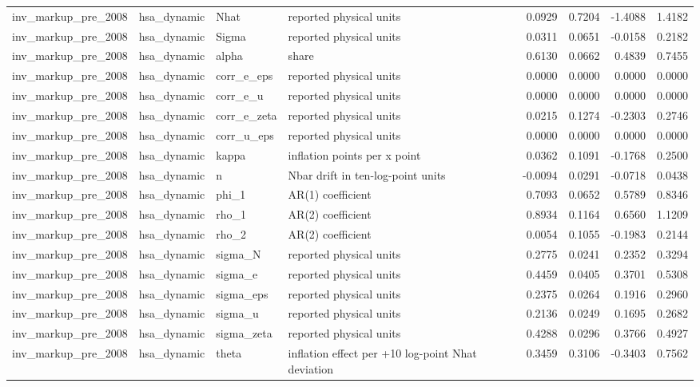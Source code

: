 \begin{tabular}{llllrrrr}
inv\_markup\_pre\_2008 & hsa\_dynamic & Nhat & reported physical units & 0.0929 & 0.7204 & -1.4088 & 1.4182 \\
inv\_markup\_pre\_2008 & hsa\_dynamic & Sigma & reported physical units & 0.0311 & 0.0651 & -0.0158 & 0.2182 \\
inv\_markup\_pre\_2008 & hsa\_dynamic & alpha & share & 0.6130 & 0.0662 & 0.4839 & 0.7455 \\
inv\_markup\_pre\_2008 & hsa\_dynamic & corr\_e\_eps & reported physical units & 0.0000 & 0.0000 & 0.0000 & 0.0000 \\
inv\_markup\_pre\_2008 & hsa\_dynamic & corr\_e\_u & reported physical units & 0.0000 & 0.0000 & 0.0000 & 0.0000 \\
inv\_markup\_pre\_2008 & hsa\_dynamic & corr\_e\_zeta & reported physical units & 0.0215 & 0.1274 & -0.2303 & 0.2746 \\
inv\_markup\_pre\_2008 & hsa\_dynamic & corr\_u\_eps & reported physical units & 0.0000 & 0.0000 & 0.0000 & 0.0000 \\
inv\_markup\_pre\_2008 & hsa\_dynamic & kappa & inflation points per x point & 0.0362 & 0.1091 & -0.1768 & 0.2500 \\
inv\_markup\_pre\_2008 & hsa\_dynamic & n & Nbar drift in ten-log-point units & -0.0094 & 0.0291 & -0.0718 & 0.0438 \\
inv\_markup\_pre\_2008 & hsa\_dynamic & phi\_1 & AR(1) coefficient & 0.7093 & 0.0652 & 0.5789 & 0.8346 \\
inv\_markup\_pre\_2008 & hsa\_dynamic & rho\_1 & AR(2) coefficient & 0.8934 & 0.1164 & 0.6560 & 1.1209 \\
inv\_markup\_pre\_2008 & hsa\_dynamic & rho\_2 & AR(2) coefficient & 0.0054 & 0.1055 & -0.1983 & 0.2144 \\
inv\_markup\_pre\_2008 & hsa\_dynamic & sigma\_N & reported physical units & 0.2775 & 0.0241 & 0.2352 & 0.3294 \\
inv\_markup\_pre\_2008 & hsa\_dynamic & sigma\_e & reported physical units & 0.4459 & 0.0405 & 0.3701 & 0.5308 \\
inv\_markup\_pre\_2008 & hsa\_dynamic & sigma\_eps & reported physical units & 0.2375 & 0.0264 & 0.1916 & 0.2960 \\
inv\_markup\_pre\_2008 & hsa\_dynamic & sigma\_u & reported physical units & 0.2136 & 0.0249 & 0.1695 & 0.2682 \\
inv\_markup\_pre\_2008 & hsa\_dynamic & sigma\_zeta & reported physical units & 0.4288 & 0.0296 & 0.3766 & 0.4927 \\
inv\_markup\_pre\_2008 & hsa\_dynamic & theta & inflation effect per +10 log-point Nhat deviation & 0.3459 & 0.3106 & -0.3403 & 0.7562 \\

\end{tabular}
